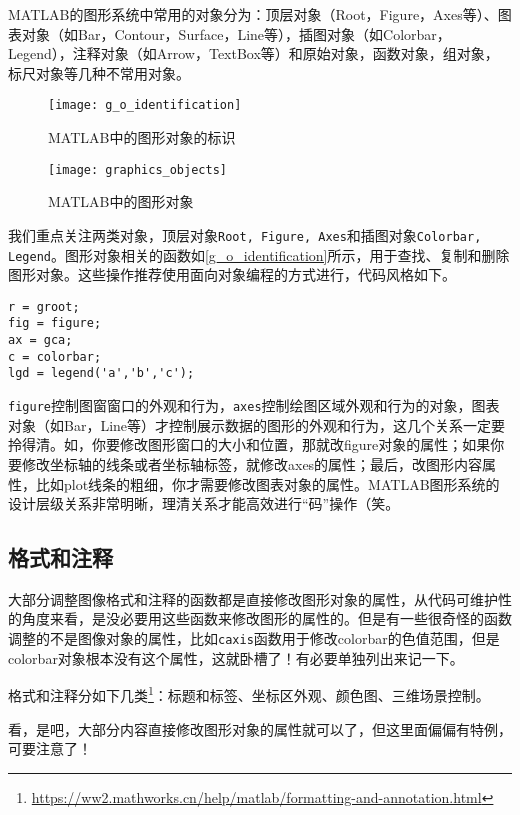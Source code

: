 MATLAB的图形系统中常用的对象分为：顶层对象（Root，Figure，Axes等）、图表对象（如Bar，Contour，Surface，Line等），插图对象（如Colorbar，Legend），注释对象（如Arrow，TextBox等）和原始对象，函数对象，组对象，标尺对象等几种不常用对象。

\begin{figure}
    \centering
    \texttt{[image: g\_o\_identification]}
    \caption{MATLAB中的图形对象的标识}
    \label{g_o_identification}
\end{figure}

\begin{figure}
    \centering
    \texttt{[image: graphics\_objects]}
    \caption{MATLAB中的图形对象}
\end{figure}

我们重点关注两类对象，顶层对象\texttt{Root, Figure, Axes}和插图对象\texttt{Colorbar, Legend}。图形对象相关的函数如\autoref{g_o_identification}所示，用于查找、复制和删除图形对象。这些操作推荐使用面向对象编程的方式进行，代码风格如下。

\begin{verbatim}
r = groot;
fig = figure;
ax = gca;
c = colorbar;
lgd = legend('a','b','c');
\end{verbatim}

\texttt{figure}控制图窗窗口的外观和行为，\texttt{axes}控制绘图区域外观和行为的对象，图表对象（如Bar，Line等）才控制展示数据的图形的外观和行为，这几个关系一定要拎得清。如，你要修改图形窗口的大小和位置，那就改figure对象的属性；如果你要修改坐标轴的线条或者坐标轴标签，就修改axes的属性；最后，改图形内容属性，比如plot线条的粗细，你才需要修改图表对象的属性。MATLAB图形系统的设计层级关系非常明晰，理清关系才能高效进行“码”操作（笑。

\subsection{格式和注释}

大部分调整图像格式和注释的函数都是直接修改图形对象的属性，从代码可维护性的角度来看，是没必要用这些函数来修改图形的属性的。但是有一些很奇怪的函数调整的不是图像对象的属性，比如\texttt{caxis}函数用于修改colorbar的色值范围，但是colorbar对象根本没有这个属性，这就卧槽了！有必要单独列出来记一下。

格式和注释分如下几类\footnote{\url{https://ww2.mathworks.cn/help/matlab/formatting-and-annotation.html}}：标题和标签、坐标区外观、颜色图、三维场景控制。

看，是吧，大部分内容直接修改图形对象的属性就可以了，但这里面偏偏有特例，可要注意了！

